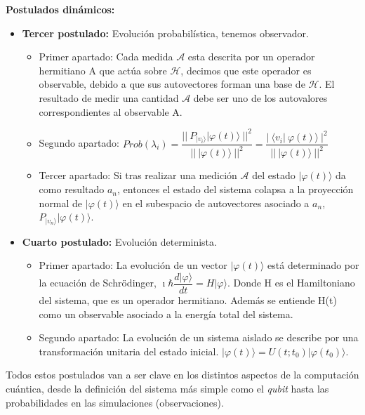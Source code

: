 \textbf{Postulados dinámicos:}
\begin{itemize}
    \item \textbf{Tercer postulado:} Evolución probabilística, tenemos observador.
        \begin{itemize}
            \item Primer apartado: Cada medida $\mathscr{A}$ esta descrita por un operador hermitiano A que actúa sobre $\mathscr{H}$, decimos que este operador es observable, debido a que sus autovectores forman una base de $\mathscr{H}$. El resultado de medir una cantidad $\mathscr{A}$ debe ser uno de los autovalores correspondientes al observable A.
            \vspace{10pt}
            \item Segundo apartado: $Prob(\lambda_{i}) =  \dfrac{||\:P_{|v_{i}\rangle} | \varphi (t) \rangle\:||^{2}}{||\:| \varphi (t) \rangle\:||^{2}} = \dfrac{|\: \langle  v_{i}  |\: \varphi (t)  \rangle\:|^{2}}{||\:| \varphi (t) \rangle\:||^{2}}$
            \vspace{10pt}
            \item Tercer apartado: Si tras realizar una medición $\mathscr{A}$ del estado $|\varphi(t) \rangle$ da como resultado $a_{n}$, entonces el estado del sistema colapsa a la proyección normal de $|\varphi(t) \rangle$ en el subespacio de autovectores asociado a $a_{n}$,  $P_{|v_{n} \rangle} | \varphi (t) \rangle$.
        \end{itemize}
        
        \vspace{5pt}
    \item \textbf{Cuarto postulado:} Evolución determinista.
        \begin{itemize}
            \item Primer apartado: La evolución de un vector $| \varphi (t) \rangle$ está determinado por la ecuación de Schrödinger, $\imath \hbar \dfrac{d|\varphi\rangle}{dt}=H |\varphi\rangle$. Donde H es el Hamiltoniano del sistema, que es un operador hermitiano. Además se entiende H(t) como un observable asociado a la energía total del sistema.
            \item Segundo apartado: La evolución de un sistema aislado se describe por una transformación unitaria del estado inicial. $| \varphi (t) \rangle = U(t;t_{0})  | \varphi (t_{0}) \rangle$.
        \end{itemize}
\end{itemize}

Todos estos postulados van a ser clave en los distintos aspectos de la computación cuántica, desde la definición del sistema más simple como el \textit{qubit} hasta las probabilidades en las simulaciones (observaciones).


